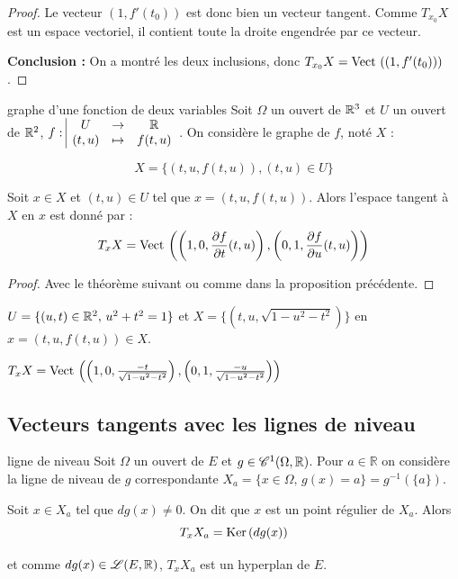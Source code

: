 \begin{proof}
    Le vecteur $(1, f'(t_0))$ est donc bien un vecteur tangent. Comme $T_{x_0}X$ est un espace vectoriel, il contient toute la droite engendrée par ce vecteur.
    
    \bigskip
    \noindent \textbf{Conclusion :} On a montré les deux inclusions, donc $T_{x_0}X = \operatorname{Vect} \,\left( (1, f'(t_0)) \right)$.
\end{proof}

\begin{propositionnt}{graphe d'une fonction de deux variables}{}
    Soit $\Omega$ un ouvert de $\mathbb{R}^3$ et $U$ un ouvert de $\mathbb{R}^2$, 
    $f: \space \begin{array}{|ccc} \displaystyle U & \to & \displaystyle \mathbb{R} \\ \displaystyle (t, u) & \mapsto & \displaystyle f(t, u) \end{array}$. On considère le graphe de $f$, 
    noté $X$ : 

    $$X = \{(t, u, f(t, u)), (t, u) \in U\}$$

    Soit $x \in X$ et $(t, u) \in U$ tel que $x = (t, u, f(t, u))$. Alors
    l'espace tangent à $X$ en $x$ est donné par :
    $$T_xX = \operatorname{Vect} \,\left( \left(1, 0, \frac{\partial f}{\partial t}(t, u)\right), \left(0, 1, \frac{\partial f}{\partial u}(t, u)\right) \right)$$
\end{propositionnt}

\begin{proof}
    Avec le théorème suivant ou comme dans la proposition précédente.
\end{proof}

\begin{exemple}
    $U = \{(u, t) \in \mathbb{R}^2, \, u^2 + t^2 = 1\}$ et $X = \{(t, u, \sqrt{1 - u^2 - t^2})\}$
    en $x = (t, u, f(t, u)) \in X$. 

    $T_xX = \operatorname{Vect} \,\left( \left(1, 0, \frac{-t}{\sqrt{1 - u^2 - t^2}}\right), \left(0, 1, \frac{-u}{\sqrt{1 - u^2 - t^2}}\right) \right)$
\end{exemple}

\subsection{Vecteurs tangents avec les lignes de niveau}

\begin{theoreme}{ligne de niveau}{}
    Soit $\Omega$ un ouvert de $E$ et $g \in \mathscr C^1(\Omega, \mathbb{R})$. 
    Pour $a \in \mathbb R$ on considère la ligne de niveau de $g$ correspondante 
    $X_a = \{x \in \Omega, \, g(x) = a \} = g^{-1}(\{a\})$.

    Soit $x \in X_a$ tel que $dg(x) \neq 0$. On dit que $x$ est un point régulier de 
    $X_a$. Alors 
    $$T_xX_a = \operatorname{Ker} \, (dg(x))$$

    et comme $dg(x) \in \mathscr L(E, \mathbb{R})$, $T_xX_a$ est un hyperplan de $E$.
\end{theoreme}


